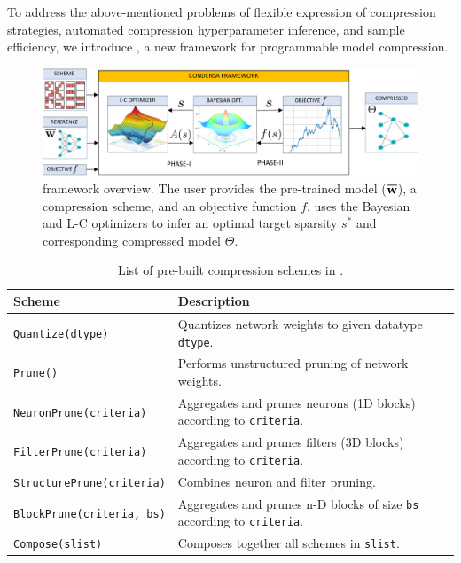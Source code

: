 To address the above-mentioned problems of flexible expression of compression strategies, automated compression hyperparameter inference, and sample efficiency, we introduce \algoName, a new framework for programmable model compression.
\begin{figure}[tbp]
\centering
\includegraphics[width=\textwidth]{img/Overview_R4.pdf}
\caption{\algoName framework overview. The user provides the pre-trained model ($\overline{{\bf w}}$), a compression scheme, and an objective function $f$. \algoName uses the Bayesian and L-C optimizers to infer an optimal target sparsity $s^*$ and corresponding compressed model $\Theta$.}
\label{fig:condensa}  
\end{figure}

\begin{figure}[tb]
	
\end{figure}

\begin{table}[tb]
\centering
        \begin{tabularx}{\linewidth}{ l  X }
				\hline
				\textbf{Scheme} & \textbf{Description} \\ \hline
				\texttt{Quantize(dtype)} & Quantizes network weights to given datatype \texttt{dtype}. \\ \hline
				\texttt{Prune()} & Performs unstructured pruning of network weights. \\ \hline
                \texttt{NeuronPrune(criteria)} & Aggregates and prunes neurons (1D blocks) according to \texttt{criteria}.\\ \hline
				\texttt{FilterPrune(criteria)} & Aggregates and prunes filters (3D blocks) according to \texttt{criteria}. \\ \hline
				\texttt{StructurePrune(criteria)} & Combines neuron and filter pruning.\\ \hline
				\texttt{BlockPrune(criteria, bs)} & Aggregates and prunes n-D blocks of size \texttt{bs} according to \texttt{criteria}.\\ \hline
				\texttt{Compose(slist)} & Composes together all schemes in \texttt{slist}.\\ \hline
           \end{tabularx}
	\caption{List of pre-built compression schemes in \algoName.}
	\label{tab:schemes}
\end{table}


